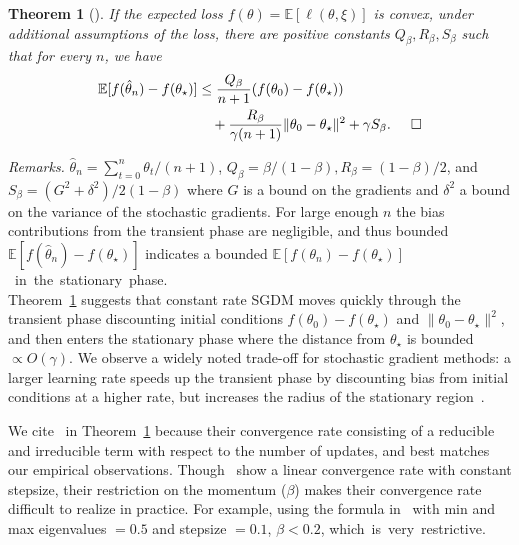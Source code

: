 \documentclass[conference]{IEEEtran}
\newcommand{\Ex}[1]{\mathbb{E}[ #1 ]}
\newtheorem{theorem}{Theorem}
\begin{document}
\begin{theorem}[\cite{Report:Yang_arXiv16}]
\label{thm:mom_convg_analysis}
If the expected loss $f(\theta) = \Ex{\ell(\theta,\xi)}$ is convex, under additional assumptions of the loss,  there are positive constants $Q_\beta, R_\beta, S_\beta$ such that for every $n$, we have
\begin{align*}
\mathbb{E} [ f ( \hat{\theta}_{n} ) - f ( \theta_\star ) ] &\leq \frac{Q_\beta}{n+1} ( f ( \theta_0 ) - f ( \theta_\star ) ) \\
&\quad + \frac{R_\beta}{\gamma ( n+1 )} \| \theta_0 - \theta_\star \|^2 + \gamma S_\beta. \hspace{0.2in} \Box
\end{align*}
\end{theorem}

\emph{Remarks.}
$\hat{\theta}_n = \sum_{t=0}^n \theta_t / (n+1)$, $Q_\beta = \beta / ( 1 - \beta ), R_\beta = ( 1 - \beta ) / 2$, and $S_\beta = ( G^2 + \delta^2 ) / 2 ( 1 - \beta )$ where $G$ is a bound on the gradients and $\delta^2$ a bound on the variance of the stochastic gradients.
For large enough $n$ the bias contributions from the transient phase are negligible, and thus bounded $\Ex{ f(\hat{\theta}_n) - f(\theta_\star) }$ indicates a bounded $\Ex{ f(\theta_n) - f(\theta_\star) }$~in~the~stationary~phase.\\

Theorem~\ref{thm:mom_convg_analysis} suggests that constant rate SGDM moves quickly through the transient phase discounting initial conditions $f ( \theta_0 ) - f ( \theta_\star )$ and $\| \theta_0 - \theta_\star \|^2$, and then enters the stationary phase where the distance from $\theta_\star$ is bounded $\propto O ( \gamma )$. 
We observe a widely noted  trade-off  for stochastic gradient methods:  a larger learning rate speeds up the transient phase by discounting bias from initial conditions at a higher rate, but increases the radius of the stationary region~\cite{Proc:Bach_NIPS11, Article:Needell_MP16}.

We cite~\cite{Report:Yang_arXiv16} in Theorem~\ref{thm:mom_convg_analysis} because their convergence rate consisting of a reducible and irreducible term with respect to the number of updates, and best matches our empirical observations. Though~\cite{Report:Loizou_arXiv17} show a linear convergence rate with constant stepsize, their restriction on the momentum ($\beta$) makes their convergence rate difficult to realize in practice. For example, using the formula in~\cite{Report:Loizou_arXiv17} with min and max eigenvalues $=0.5$ and stepsize $=0.1$, $\beta < 0.2$, which~is~very~restrictive. 
\end{document}
